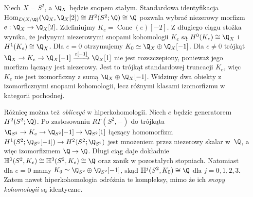 \begin{przyklad}
\label{ex:derived-not-split-xiv}
Niech $X=S^2$, a $\Q_X$ będzie snopem stałym.
Standardowa identyfikacja
$\operatorname{Hom}_{D(X;\Q)}(\Q_X,\Q_X[2])
\cong H^2(S^2;\Q)\cong\Q$
pozwala wybrać niezerowy morfizm
$e:\Q_X\to\Q_X[2]$.
Zdefiniujmy $K_e=\operatorname{Cone}(e)[-2]$.
Z długiego ciągu stożka wynika, że jedynymi
niezerowymi snopami kohomologii $K_e$ są
$H^0(K_e)\cong\Q_X$ i $H^1(K_e)\cong\Q_X$.
Dla $e=0$ otrzymujemy
$K_0\simeq\Q_X\oplus\Q_X[-1]$.
Dla $e\ne0$ trójkąt
$\Q_X\to K_e\to\Q_X[-1]\xrightarrow{e[-1]}\Q_X[1]$
nie jest rozszczepiony, ponieważ jego morfizm łączący
jest niezerowy. Jest to trójkąt standardowej truncacji
$K_e$, więc $K_e$ nie jest izomorficzny z sumą
$\Q_X\oplus\Q_X[-1]$.
Widzimy dwa obiekty z izomorficznymi snopami
kohomologii, lecz różnymi klasami izomorfizmu
w kategorii pochodnej.

Różnicę można też \emph{obliczyć} w hiperkohomologii.
Niech $e$ będzie generatorem $H^2(S^2;\Q)$. Po zastosowaniu
$R\Gamma(S^2,-)$ do trójkąta
$\Q_{S^2}\to K_e\to\Q_{S^2}[-1]\to\Q_{S^2}[1]$
łączący homomorfizm
$H^1(S^2;\Q_{S^2}[-1])\to H^2(S^2;\Q_{S^2})$
jest mnożeniem przez niezerowy skalar w~$\Q$, a więc
izomorfizmem $\Q\to\Q$. Długi ciąg daje dokładnie
$\mathbb H^0(S^2,K_e)\cong\mathbb H^3(S^2,K_e)\cong\Q$
oraz zanik w pozostałych stopniach. Natomiast dla $e=0$
mamy $K_0\simeq\Q_{S^2}\oplus\Q_{S^2}[-1]$, skąd
$\mathbb H^j(S^2,K_0)\cong\Q$ dla $j=0,1,2,3$.
Zatem nawet hiperkohomologia odróżnia te kompleksy,
mimo że ich \emph{snopy kohomologii} są identyczne.
\end{przyklad}

